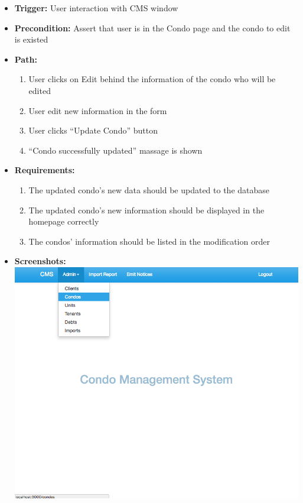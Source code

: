 \begin{itemize}
  \item[] \textbf{Trigger:} User interaction with CMS window
  \item[] \textbf{Precondition:} Assert that user is in the Condo page and the condo to edit is existed
  \item[] \textbf{Path:}
    \begin{enumerate}
      \item User clicks on Edit behind the information of the condo who will be edited
      \item User edit new information in the form
      \item User clicks ``Update Condo'' button
      \item ``Condo successfully updated'' massage is shown
    \end{enumerate}
  \item[] \textbf{Requirements:}
    \begin{enumerate}
      \item The updated condo’s new data should be updated to the database
      \item The updated condo’s new information should be displayed in the homepage correctly
      \item The condos’ information should be listed in the modification order
    \end{enumerate}
  \item[] \textbf{Screenshots:}\\
    \includegraphics[scale=0.25]{./images/ss/condo/edit/1.png}

\end{itemize}
